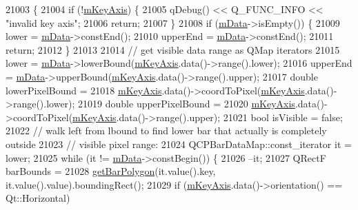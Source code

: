 \begin{DoxyCode}
21003                                                  \{
21004   \textcolor{keywordflow}{if} (!\hyperlink{class_q_c_p_abstract_plottable_a426f42e254d0f8ce5436a868c61a6827}{mKeyAxis}) \{
21005     qDebug() << Q\_FUNC\_INFO << \textcolor{stringliteral}{"invalid key axis"};
21006     \textcolor{keywordflow}{return};
21007   \}
21008   \textcolor{keywordflow}{if} (\hyperlink{class_q_c_p_bars_aef28d29d51ef84b608ecd22c55d531ff}{mData}->isEmpty()) \{
21009     lower = \hyperlink{class_q_c_p_bars_aef28d29d51ef84b608ecd22c55d531ff}{mData}->constEnd();
21010     upperEnd = \hyperlink{class_q_c_p_bars_aef28d29d51ef84b608ecd22c55d531ff}{mData}->constEnd();
21011     \textcolor{keywordflow}{return};
21012   \}
21013 
21014   \textcolor{comment}{// get visible data range as QMap iterators}
21015   lower = \hyperlink{class_q_c_p_bars_aef28d29d51ef84b608ecd22c55d531ff}{mData}->lowerBound(\hyperlink{class_q_c_p_abstract_plottable_a426f42e254d0f8ce5436a868c61a6827}{mKeyAxis}.data()->range().lower);
21016   upperEnd = \hyperlink{class_q_c_p_bars_aef28d29d51ef84b608ecd22c55d531ff}{mData}->upperBound(\hyperlink{class_q_c_p_abstract_plottable_a426f42e254d0f8ce5436a868c61a6827}{mKeyAxis}.data()->range().upper);
21017   \textcolor{keywordtype}{double} lowerPixelBound =
21018       \hyperlink{class_q_c_p_abstract_plottable_a426f42e254d0f8ce5436a868c61a6827}{mKeyAxis}.data()->coordToPixel(\hyperlink{class_q_c_p_abstract_plottable_a426f42e254d0f8ce5436a868c61a6827}{mKeyAxis}.data()->range().lower);
21019   \textcolor{keywordtype}{double} upperPixelBound =
21020       \hyperlink{class_q_c_p_abstract_plottable_a426f42e254d0f8ce5436a868c61a6827}{mKeyAxis}.data()->coordToPixel(\hyperlink{class_q_c_p_abstract_plottable_a426f42e254d0f8ce5436a868c61a6827}{mKeyAxis}.data()->range().upper);
21021   \textcolor{keywordtype}{bool} isVisible = \textcolor{keyword}{false};
21022   \textcolor{comment}{// walk left from lbound to find lower bar that actually is completely outside}
21023   \textcolor{comment}{// visible pixel range:}
21024   QCPBarDataMap::const\_iterator it = lower;
21025   \textcolor{keywordflow}{while} (it != \hyperlink{class_q_c_p_bars_aef28d29d51ef84b608ecd22c55d531ff}{mData}->constBegin()) \{
21026     --it;
21027     QRectF barBounds =
21028         \hyperlink{class_q_c_p_bars_a1d118a76662cfd691a78c6f573e3f78c}{getBarPolygon}(it.value().key, it.value().value).boundingRect();
21029     \textcolor{keywordflow}{if} (\hyperlink{class_q_c_p_abstract_plottable_a426f42e254d0f8ce5436a868c61a6827}{mKeyAxis}.data()->orientation() == Qt::Horizontal)

\end{DoxyCode}
